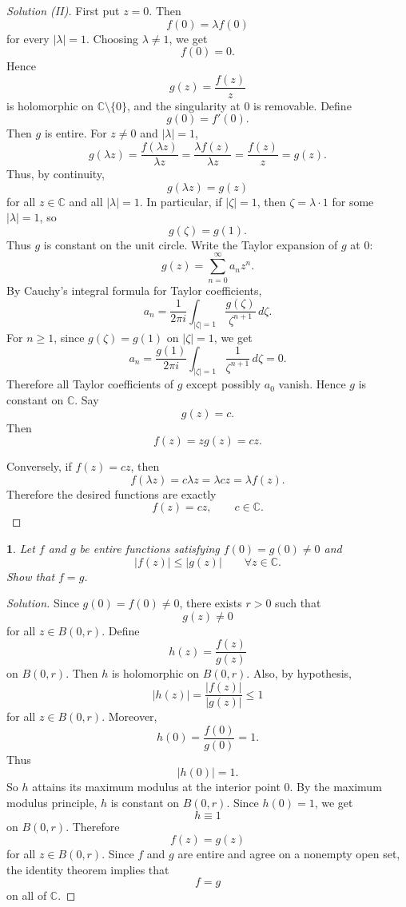 \documentclass[12pt, a4paper]{report}
\theoremstyle{spaced}
\newtheorem{exercise}{}
\begin{document}
\begin{proof}[Solution (II)]
	First put \(z=0\). Then
	\[
		f(0)=\lambda f(0)
	\]
	for every \(|\lambda|=1\). Choosing \(\lambda\neq 1\), we get
	\[
		f(0)=0.
	\]
	Hence
	\[
		g(z)=\frac{f(z)}{z}
	\]
	is holomorphic on \(\mathbb C\setminus\{0\}\), and the singularity at \(0\) is
	removable. Define
	\[
		g(0)=f'(0).
	\]
	Then \(g\) is entire.
	For \(z\neq 0\) and \(|\lambda|=1\),
	\[
		g(\lambda z)
		=\frac{f(\lambda z)}{\lambda z}
		=\frac{\lambda f(z)}{\lambda z}
		=\frac{f(z)}{z}
		=g(z).
	\]
	Thus, by continuity,
	\[
		g(\lambda z)=g(z)
	\]
	for all \(z\in\mathbb C\) and all \(|\lambda|=1\).
	In particular, if \(|\zeta|=1\), then \(\zeta=\lambda\cdot 1\) for some
	\(|\lambda|=1\), so
	\[
		g(\zeta)=g(1).
	\]
	Thus \(g\) is constant on the unit circle.
	Write the Taylor expansion of \(g\) at \(0\):
	\[
		g(z)=\sum_{n=0}^{\infty}a_nz^n.
	\]
	By Cauchy's integral formula for Taylor coefficients,
	\[
		a_n=\frac{1}{2\pi i}\int_{|\zeta|=1}
		\frac{g(\zeta)}{\zeta^{n+1}}\,d\zeta .
	\]
	For \(n\ge 1\), since \(g(\zeta)=g(1)\) on \(|\zeta|=1\), we get
	\[
		a_n
		=\frac{g(1)}{2\pi i}\int_{|\zeta|=1}\frac{1}{\zeta^{n+1}}\,d\zeta
		=0.
	\]
	Therefore all Taylor coefficients of \(g\) except possibly \(a_0\) vanish.
	Hence \(g\) is constant on \(\mathbb C\). Say
	\[
		g(z)=c.
	\]
	Then
	\[
		f(z)=zg(z)=cz.
	\]

	Conversely, if \(f(z)=cz\), then
	\[
		f(\lambda z)=c\lambda z=\lambda cz=\lambda f(z).
	\]
	Therefore the desired functions are exactly
	\[
		f(z)=cz,\qquad c\in\mathbb C.
	\]
\end{proof}



\begin{exercise}
	Let $f$ and $g$ be entire functions satisfying $f(0)=g(0)\neq 0$ and
	\[
		|f(z)|\leq |g(z)| \qquad \forall z\in\mathbb{C}.
	\]
	Show that $f=g$.
\end{exercise}
\begin{proof}[Solution]
	Since \(g(0)=f(0)\neq 0\), there exists \(r>0\) such that
	\[
		g(z)\neq 0
	\]
	for all \(z\in B(0,r)\). Define
	\[
		h(z)=\frac{f(z)}{g(z)}
	\]
	on \(B(0,r)\). Then \(h\) is holomorphic on \(B(0,r)\). Also, by hypothesis,
	\[
		|h(z)|=\frac{|f(z)|}{|g(z)|}\le 1
	\]
	for all \(z\in B(0,r)\). Moreover,
	\[
		h(0)=\frac{f(0)}{g(0)}=1.
	\]
	Thus
	\[
		|h(0)|=1.
	\]
	So \(h\) attains its maximum modulus at the interior point \(0\). By the
	maximum modulus principle, \(h\) is constant on \(B(0,r)\). Since \(h(0)=1\),
	we get
	\[
		h\equiv 1
	\]
	on \(B(0,r)\). Therefore
	\[
		f(z)=g(z)
	\]
	for all \(z\in B(0,r)\).
	Since \(f\) and \(g\) are entire and agree on a nonempty open set, the identity
	theorem implies that
	\[
		f=g
	\]
	on all of \(\mathbb C\).
\end{proof}
\end{document}

